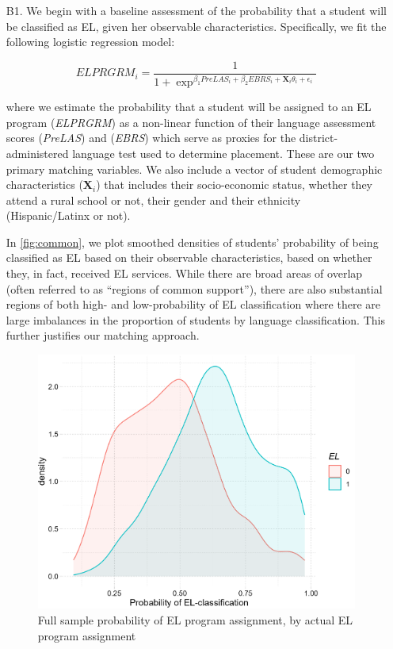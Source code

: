 \documentclass[a4paper, 11pt]{article}
\begin{document}
\begin{enumerate}
	\item[B1.] We begin with a baseline assessment of the probability that a student will be classified as EL, given her observable characteristics. Specifically, we fit the following logistic regression model:

\begin{equation}
	ELPRGRM_{i}= \frac{1}{1+\exp^{\beta_{1}PreLAS_{i} + \beta_{2}EBRS_{i} + \textbf{X}_i\theta_{i} + \epsilon_{i}}}
\end{equation}


	where we estimate the probability that a student will be assigned to an EL program (\textit{ELPRGRM}) as a non-linear function of their language assessment scores (\textit{PreLAS}) and (\textit{EBRS}) which serve as proxies for the district-administered language test used to determine placement. These are our two primary matching variables. We also include a vector of student demographic characteristics (\textbf{X$_{i}$}) that includes their socio-economic status, whether they attend a rural school or not, their gender and their ethnicity (Hispanic/Latinx or not). 

	In \autoref{fig:common}, we plot smoothed densities of students' probability of being classified as EL based on their observable characteristics, based on whether they, in fact, received EL services. While there are broad areas of overlap (often referred to as ``regions of common support''), there are also substantial regions of both high- and low-probability of EL classification where there are large imbalances in the proportion of students by language classification. This further justifies our matching approach.

	\begin{figure}
		\begin{center}
			\includegraphics[scale=0.7]{figures/base_common_support.png}
			\caption{Full sample probability of EL program assignment, by actual EL program assignment} \label{fig:common}
		\end{center}
	\end{figure}


\end{enumerate}
\end{document}
